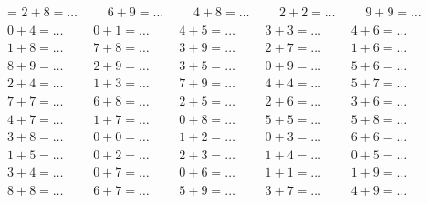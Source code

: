 \baselineskip=16pt
\magnification=
\nopagenumbers
\noindent
$ 2 + 8 = \ldots \qquad $
$ 6 + 9 = \ldots \qquad $
$ 4 + 8 = \ldots \qquad $
$ 2 + 2 = \ldots \qquad $
$ 9 + 9 = \ldots \qquad $
$ 0 + 4 = \ldots \qquad $
$ 0 + 1 = \ldots \qquad $
$ 4 + 5 = \ldots \qquad $
$ 3 + 3 = \ldots \qquad $
$ 4 + 6 = \ldots \qquad $
$ 1 + 8 = \ldots \qquad $
$ 7 + 8 = \ldots \qquad $
$ 3 + 9 = \ldots \qquad $
$ 2 + 7 = \ldots \qquad $
$ 1 + 6 = \ldots \qquad $
$ 8 + 9 = \ldots \qquad $
$ 2 + 9 = \ldots \qquad $
$ 3 + 5 = \ldots \qquad $
$ 0 + 9 = \ldots \qquad $
$ 5 + 6 = \ldots \qquad $
$ 2 + 4 = \ldots \qquad $
$ 1 + 3 = \ldots \qquad $
$ 7 + 9 = \ldots \qquad $
$ 4 + 4 = \ldots \qquad $
$ 5 + 7 = \ldots \qquad $
$ 7 + 7 = \ldots \qquad $
$ 6 + 8 = \ldots \qquad $
$ 2 + 5 = \ldots \qquad $
$ 2 + 6 = \ldots \qquad $
$ 3 + 6 = \ldots \qquad $
$ 4 + 7 = \ldots \qquad $
$ 1 + 7 = \ldots \qquad $
$ 0 + 8 = \ldots \qquad $
$ 5 + 5 = \ldots \qquad $
$ 5 + 8 = \ldots \qquad $
$ 3 + 8 = \ldots \qquad $
$ 0 + 0 = \ldots \qquad $
$ 1 + 2 = \ldots \qquad $
$ 0 + 3 = \ldots \qquad $
$ 6 + 6 = \ldots \qquad $
$ 1 + 5 = \ldots \qquad $
$ 0 + 2 = \ldots \qquad $
$ 2 + 3 = \ldots \qquad $
$ 1 + 4 = \ldots \qquad $
$ 0 + 5 = \ldots \qquad $
$ 3 + 4 = \ldots \qquad $
$ 0 + 7 = \ldots \qquad $
$ 0 + 6 = \ldots \qquad $
$ 1 + 1 = \ldots \qquad $
$ 1 + 9 = \ldots \qquad $
$ 8 + 8 = \ldots \qquad $
$ 6 + 7 = \ldots \qquad $
$ 5 + 9 = \ldots \qquad $
$ 3 + 7 = \ldots \qquad $
$ 4 + 9 = \ldots \qquad $
\bye

